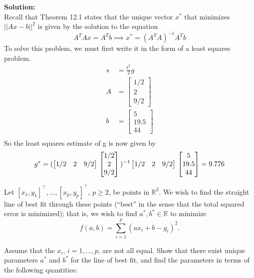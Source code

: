 \documentclass{article}
\begin{document}
\begin{enumerate}
\textbf{Solution: }\\
Recall that Theorem 12.1 states that the unique vector $x^*$ that minimizes $||Ax-b||^2$ is given by the solution to the equation
\[ A^TAx = A^Tb \implies x^* = (A^TA)^{-1} A^T b\]
To solve this problem, we must first write it in the form of a least squares problem.
\begin{align*}
    s &= \frac{t^2}{2}g \\
    A &= \begin{bmatrix}
        1/2 \\ 2 \\ 9/2
    \end{bmatrix}\\
    b &= \begin{bmatrix}
        5 \\ 19.5 \\ 44
    \end{bmatrix} \\
\end{align*}
So the least squares estimate of g is now given by 
\[
    g^* = (\begin{bmatrix}
        1/2 & 2 & 9/2
    \end{bmatrix}\\\begin{bmatrix}
        1/2 \\ 2 \\ 9/2
    \end{bmatrix}\\)^{-1}\begin{bmatrix}
        1/2 & 2 & 9/2
    \end{bmatrix}\\\begin{bmatrix}
        5 \\ 19.5 \\ 44
    \end{bmatrix} = 9.776
    \]


\bigbreak
\begin{bb}
\item
Let $[x_1, y_1]^\top, \dots, [x_p, y_p]^\top$, $p \geq 2$, be points in $\mathbb{R}^2$. We wish to find the straight line of best fit through these points (``best'' in the sense that the total squared error is minimized); that is, we wish to find $a^*, b^* \in \mathbb{R}$ to minimize
\[
f(a, b) = \sum_{i=1}^p (a x_i + b - y_i)^2.
\]

Assume that the $x_i$, $i = 1, \dots, p$, are not all equal. Show that there exist unique parameters $a^*$ and $b^*$ for the line of best fit, and find the parameters in terms of the following quantities:


\end{bb}
\end{enumerate}
\end{document}
